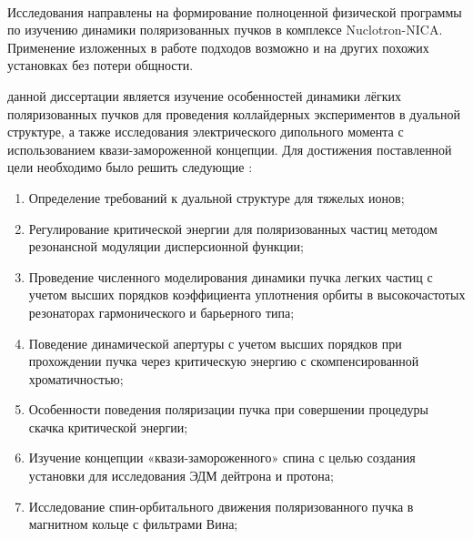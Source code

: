 ~\\
\par {\actuality} Исследования направлены на формирование полноценной физической программы по изучению динамики поляризованных пучков в комплексе Nuclotron-NICA. Применение изложенных в работе подходов возможно и на других похожих установках без потери общности.
~\\
\par {\aim} данной диссертации является изучение особенностей динамики лёгких поляризованных пучков для проведения коллайдерных экспериментов в дуальной структуре, а также исследования электрического дипольного момента с использованием квази-замороженной концепции.
Для достижения поставленной цели необходимо было 
решить следующие {\tasks}:
\begin{enumerate}[beginpenalty=10000] %
	\item	Определение требований к дуальной структуре для тяжелых ионов;
	\item	Регулирование критической энергии для поляризованных частиц методом резонансной модуляции дисперсионной функции;
	\item	Проведение численного моделирования динамики пучка легких частиц с учетом высших порядков коэффициента уплотнения орбиты в высокочастотых резонаторах гармонического и барьерного типа;
	\item 	Поведение динамической апертуры с учетом высших порядков при прохождении пучка через критическую энергию с скомпенсированной хроматичностью;
	\item 	Особенности поведения поляризации пучка при совершении процедуры скачка критической энергии;
	\item 	Изучение концепции «квази-замороженного» спина с целью создания установки для исследования ЭДМ дейтрона и протона;
	\item	Исследование спин-орбитального движения поляризованного пучка в магнитном кольце с фильтрами Вина;
\end{enumerate}
